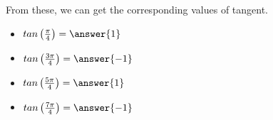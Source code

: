 \documentclass{ximera}
\begin{document}
From these, we can get the corresponding values of tangent.



\begin{question}



\begin{itemize}
\item $tan\left(\frac{\pi}{4}\right) = \answer{1}$ \\
\item $tan\left(\frac{3\pi}{4}\right) = \answer{-1}$ \\
\item $tan\left(\frac{5\pi}{4}\right) = \answer{1}$ \\
\item $tan\left(\frac{7\pi}{4}\right) = \answer{-1}$ \\
\end{itemize}



\end{question}
\end{document}
